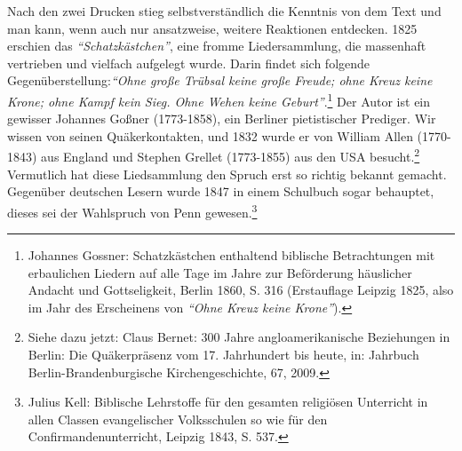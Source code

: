 Nach den zwei Drucken stieg selbstverständlich die Kenntnis von dem Text und man
kann, wenn auch nur ansatzweise, weitere Reaktionen entdecken. 1825 erschien das
\textit{"`Schatzkästchen"'}, eine fromme Liedersammlung, die massenhaft vertrieben und
vielfach aufgelegt wurde. Darin findet sich folgende Gegenüberstellung:\textit{"`Ohne
große Trübsal keine große Freude; ohne Kreuz keine Krone; ohne Kampf kein Sieg.
Ohne Wehen keine Geburt"'}.\footnote{Johannes Gossner: Schatzkästchen enthaltend
biblische Betrachtungen mit
erbaulichen Liedern auf alle Tage im Jahre zur Beförderung häuslicher Andacht
und Gottseligkeit, Berlin 1860, S. 316 (Erstauflage Leipzig 1825, also im Jahr
des Erscheinens von \textit{"`Ohne Kreuz keine Krone"'}).} Der Autor ist ein gewisser
Johannes Goßner (1773-1858), ein Berliner pietistischer Prediger. Wir wissen von
seinen Quäkerkontakten, und 1832 wurde er von William Allen (1770-1843) aus
England und Stephen Grellet (1773-1855) aus den USA besucht.\footnote{Siehe dazu
jetzt: Claus Bernet: 300 Jahre angloamerikanische Beziehungen in
Berlin: Die Quäkerpräsenz vom 17. Jahrhundert bis heute, in: Jahrbuch
Berlin-Brandenburgische Kirchengeschichte, 67, 2009.} Vermutlich hat diese
Liedsammlung den Spruch erst so richtig bekannt gemacht. Gegenüber deutschen
Lesern wurde 1847 in einem Schulbuch sogar behauptet, dieses sei der Wahlspruch
von Penn gewesen.\footnote{Julius Kell: Biblische Lehrstoffe für den gesamten
religiösen Unterricht
in allen Classen evangelischer Volksschulen so wie für den
Confirmandenunterricht, Leipzig 1843, S. 537.}

\medskip

